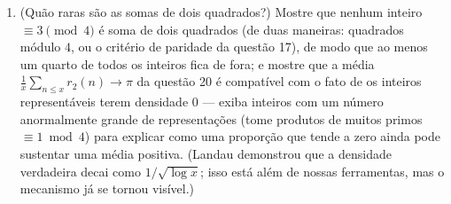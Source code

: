\begin{problem}
\begin{enumerate}[resume]
        \[
        \sum_{d \leq x}\chi(d)\Bigl\lfloor\frac
        xd\Bigr\rfloor = \frac{\pi x}4 + O(\sqrt x),
        \]
        e deduza --- removendo as partes inteiras com cuidado --- a
        série de Leibniz
        \[
        1 - \frac13 + \frac15 - \frac17 + \dots = \frac\pi4 .
        \]
        A série alternada dos inversos ímpares \emph{é} o excesso médio
        dos divisores $\equiv 1$ sobre os divisores $\equiv 3$: a análise
        calculada pela aritmética.
  \item (Quão raras são as somas de dois quadrados?) Mostre que nenhum
        inteiro $\equiv 3 \pmod 4$ é soma de dois quadrados (de duas maneiras:
        quadrados módulo $4$, ou o critério de paridade da questão
        17), de modo que ao menos um quarto de todos os inteiros fica
        de fora; e mostre que a média $\frac1x\sum_{n\leq
        x}r_2(n) \to \pi$ da questão 20 é compatível
        com o fato de os inteiros representáveis terem densidade
        $0$ --- exiba inteiros com um número anormalmente grande de
        representações (tome produtos de muitos primos $\equiv 1 \bmod 4$) para
        explicar como uma proporção que tende a zero ainda pode
        sustentar uma média positiva. (Landau demonstrou que a
        densidade verdadeira decai como $1/\sqrt{\log x}$; isso está além de nossas
        ferramentas, mas o mecanismo já se tornou visível.)
\end{enumerate}


\end{problem}
